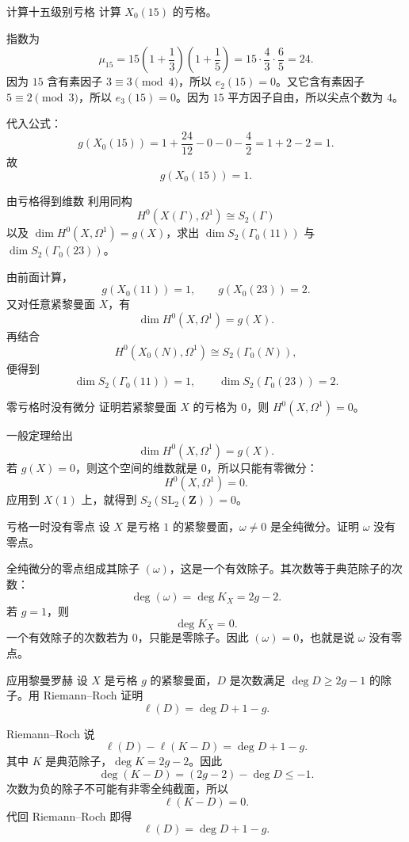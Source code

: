 \begin{problem}{计算十五级别亏格}
\medium
计算 $X_0(15)$ 的亏格。
\end{problem}
\begin{solution}
指数为
\[
\mu_{15}=15\left(1+\frac13\right)\left(1+\frac15\right)=15\cdot\frac43\cdot\frac65=24.
\]
因为 $15$ 含有素因子 $3\equiv3\pmod4$，所以 $e_2(15)=0$。又它含有素因子 $5\equiv2\pmod3$，所以 $e_3(15)=0$。因为 $15$ 平方因子自由，所以尖点个数为 $4$。

代入公式：
\[
g(X_0(15))=1+\frac{24}{12}-0-0-\frac42=1+2-2=1.
\]
故
\[
g(X_0(15))=1.
\]
\end{solution}

\begin{problem}{由亏格得到维数}
\medium
利用同构
\[
H^0(X(\Gamma),\Omega^1)\cong S_2(\Gamma)
\]
以及 $\dim H^0(X,\Omega^1)=g(X)$，求出 $\dim S_2(\Gamma_0(11))$ 与 $\dim S_2(\Gamma_0(23))$。
\end{problem}
\begin{solution}
由前面计算，
\[
g(X_0(11))=1,
\qquad
g(X_0(23))=2.
\]
又对任意紧黎曼面 $X$，有
\[
\dim H^0(X,\Omega^1)=g(X).
\]
再结合
\[
H^0(X_0(N),\Omega^1)\cong S_2(\Gamma_0(N)),
\]
便得到
\[
\dim S_2(\Gamma_0(11))=1,
\qquad
\dim S_2(\Gamma_0(23))=2.
\]
\end{solution}

\begin{problem}{零亏格时没有微分}
\medium
证明若紧黎曼面 $X$ 的亏格为 $0$，则 $H^0(X,\Omega^1)=0$。
\end{problem}
\begin{solution}
一般定理给出
\[
\dim H^0(X,\Omega^1)=g(X).
\]
若 $g(X)=0$，则这个空间的维数就是 $0$，所以只能有零微分：
\[
H^0(X,\Omega^1)=0.
\]
应用到 $X(1)$ 上，就得到 $S_2(\mathrm{SL}_2(\mathbf Z))=0$。
\end{solution}

\begin{problem}{亏格一时没有零点}
\medium
设 $X$ 是亏格 $1$ 的紧黎曼面，$\omega\ne0$ 是全纯微分。证明 $\omega$ 没有零点。
\end{problem}
\begin{solution}
全纯微分的零点组成其除子 $(\omega)$，这是一个有效除子。其次数等于典范除子的次数：
\[
\deg(\omega)=\deg K_X=2g-2.
\]
若 $g=1$，则
\[
\deg K_X=0.
\]
一个有效除子的次数若为 $0$，只能是零除子。因此 $(\omega)=0$，也就是说 $\omega$ 没有零点。
\end{solution}

\begin{problem}{应用黎曼罗赫}
\medium
设 $X$ 是亏格 $g$ 的紧黎曼面，$D$ 是次数满足 $\deg D\ge 2g-1$ 的除子。用 Riemann--Roch 证明
\[
\ell(D)=\deg D+1-g.
\]
\end{problem}
\begin{solution}
Riemann--Roch 说
\[
\ell(D)-\ell(K-D)=\deg D+1-g.
\]
其中 $K$ 是典范除子，$\deg K=2g-2$。因此
\[
\deg(K-D)=(2g-2)-\deg D\le -1.
\]
次数为负的除子不可能有非零全纯截面，所以
\[
\ell(K-D)=0.
\]
代回 Riemann--Roch 即得
\[
\ell(D)=\deg D+1-g.
\]
\end{solution}

